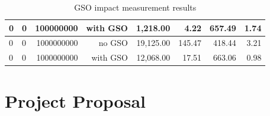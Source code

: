 \documentclass[12pt,a4paper,twoside,openright]{report}
\begin{document}
\begin{table}[H]
\begin{tabular}{|l|l|r|r|r|r|r|r|}
0                                                                                          & 0                                                                                             & 100000000                                                                                      & with GSO                                                                      & 1,218.00                                                                                        & 4.22                                                                                                          & 657.49                                                                                        & 1.74                                                                                                        \\ \hline
0                                                                                          & 0                                                                                             & 1000000000                                                                                     & no GSO                                                                        & 19,125.00                                                                                       & 145.47                                                                                                        & 418.44                                                                                        & 3.21                                                                                                        \\ \hline
0                                                                                          & 0                                                                                             & 1000000000                                                                                     & with GSO                                                                      & 12,068.00                                                                                       & 17.51                                                                                                         & 663.06                                                                                        & 0.98                                                                                                        \\ \hline
\end{tabular}
    \centering
    \caption{GSO impact measurement results}
    \label{GSO_impact_measurement_results}
\end{table}

\chapter{Project Proposal}

 
\end{document}
